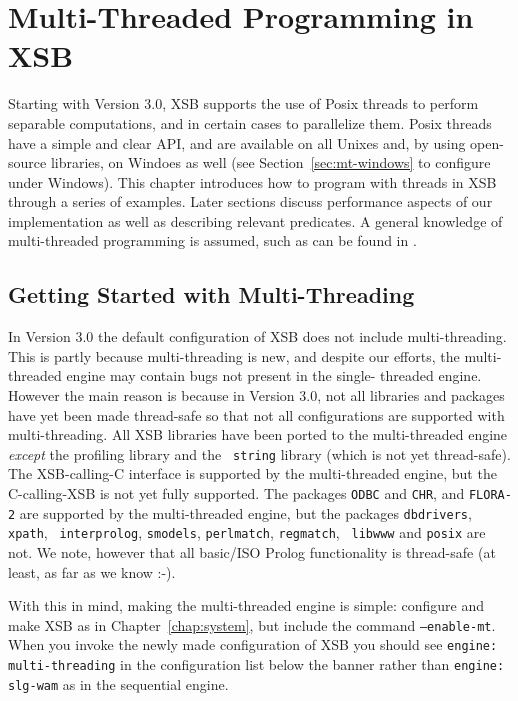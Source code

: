\chapter{Multi-Threaded Programming in XSB} \label{chap:threads}

Starting with Version 3.0, XSB supports the use of Posix threads to
perform separable computations, and in certain cases to parallelize
them.  Posix threads have a simple and clear API, and are available on
all Unixes and, by using open-source libraries, on Windoes as well (see
Section~\ref{sec:mt-windows} to configure under Windows).  This
chapter introduces how to program with threads in XSB through a series
of examples.  Later sections discuss performance aspects of our
implementation as well as describing relevant predicates.  A general
knowledge of multi-threaded programming is assumed, such as can be
found in \cite{LewB98,Bute97}.

\section{Getting Started with Multi-Threading}
%
In Version 3.0 the default configuration of XSB does not include
multi-threading.  This is partly because multi-threading is new, and
despite our efforts, the multi-threaded engine may contain bugs not
present in the single- threaded engine.  However the main reason is
because in Version 3.0, not all libraries and packages have yet been
made thread-safe so that not all configurations are supported with
multi-threading.  All XSB libraries have been ported to the
multi-threaded engine {\em except} the profiling library and the {\tt
  string} library (which is not yet thread-safe).  The XSB-calling-C
interface is supported by the multi-threaded engine, but the
C-calling-XSB is not yet fully supported.  The packages {\tt ODBC} and
{\tt CHR}, and {\tt FLORA-2} are supported by the multi-threaded
engine, but the packages {\tt dbdrivers}, {\tt xpath}, {\tt
  interprolog}, {\tt smodels}, {\tt perlmatch}, {\tt regmatch}, {\tt
  libwww} and {\tt posix} are not.  We note, however that all
basic/ISO Prolog functionality is thread-safe (at least, as far as we
know :-).

With this in mind, making the multi-threaded engine is simple:
configure and make XSB as in Chapter~\ref{chap:system}, but include
the command {\tt --enable-mt}.  When you invoke the newly made
configuration of XSB you should see {\tt engine: multi-threading} in
the configuration list below the banner rather than {\tt engine:
  slg-wam} as in the sequential engine.

